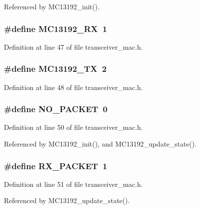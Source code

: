 Referenced by MC13192\_\-init().
\subsubsection{\setlength{\rightskip}{0pt plus 5cm}\#define MC13192\_\-RX~1}\label{group__ro__transceiver__mac_g7e0eefa1d6f5111fafc7742caeb9c919}




Definition at line 47 of file transceiver\_\-mac.h.
\subsubsection{\setlength{\rightskip}{0pt plus 5cm}\#define MC13192\_\-TX~2}\label{group__ro__transceiver__mac_g926b262c765b52f8607f475062d0e79f}




Definition at line 48 of file transceiver\_\-mac.h.
\subsubsection{\setlength{\rightskip}{0pt plus 5cm}\#define NO\_\-PACKET~0}\label{group__ro__transceiver__mac_g8ac4964a6cca903f40f29b27f71ef9a1}




Definition at line 50 of file transceiver\_\-mac.h.

Referenced by MC13192\_\-init(), and MC13192\_\-update\_\-state().
\subsubsection{\setlength{\rightskip}{0pt plus 5cm}\#define RX\_\-PACKET~1}\label{group__ro__transceiver__mac_gb2b34141e1e324bb7389e1cd3940a4f1}




Definition at line 51 of file transceiver\_\-mac.h.

Referenced by MC13192\_\-update\_\-state().
